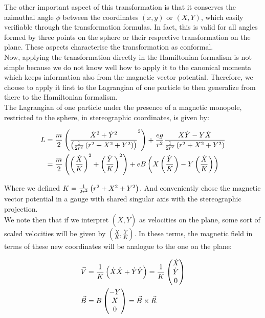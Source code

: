 The other important aspect of this transformation is that it conserves the azimuthal angle $\phi$ between the coordinates $(x,y)$ or $(X,Y)$, which easily verifiable through the transformation formulas. In fact, this is valid for all angles formed by three points on the sphere or their respective transformation on the plane. These aspects characterise the transformation as conformal.\\

Now, applying the transformation directly in the Hamiltonian formalism is not simple because we do not know well how to apply it to the canonical momenta which keeps information also from the magnetic vector potential. Therefore, we choose to apply it first to the Lagrangian of one particle to then generalize from there to the Hamiltonian formalism.\\

The Lagrangian of one particle under the presence of a magnetic monopole, restricted to the sphere, in stereographic coordinates, is given by:

\begin{align}
L &= \frac{m}{2}\left( \frac{\dot{X}^2+\dot{Y}^2}{\left( \frac{1}{2r^2}\left( r^2+X^2+Y^2 \right) \right)}^2 \right) + \frac{eg}{r^2}\frac{X\dot{Y}-Y\dot{X}}{\frac{1}{2r^2}\left( r^2+X^2+Y^2 \right)} \nonumber \\
&= \frac{m}{2}\left( \left( \frac{\dot{X}}{K} \right)^2+\left( \frac{\dot{Y}}{K} \right)^2 \right) + eB\left( X\left( \frac{\dot{Y}}{K} \right)-Y\left( \frac{\dot{X}}{K} \right) \right)
\end{align}

Where we defined $K=\frac{1}{2r^2}\left( r^2+X^2+Y^2 \right)$. And conveniently chose the magnetic vector potential in a gauge with shared singular axis with the stereographic projection.\\

We note then that if we interpret $(\dot{X},\dot{Y})$ as velocities on the plane, some sort of scaled velocities will be given by $(\frac{\dot{X}}{K},\frac{\dot{Y}}{K})$. In these terms, the magnetic field in terms of these new coordinates will be analogue to the one on the plane:

\begin{align*}
\vec{V} &= \frac{1}{K}\left( \dot{X}\hat{X} + \dot{Y}\hat{Y} \right) = \frac{1}{K}\begin{pmatrix} \dot{X} \\ \dot{Y}\\0 \end{pmatrix} \\
\vec{B} &= B\begin{pmatrix} -Y \\ X \\ 0 \end{pmatrix} = \vec{B}\times \vec{R} 
\end{align*}


